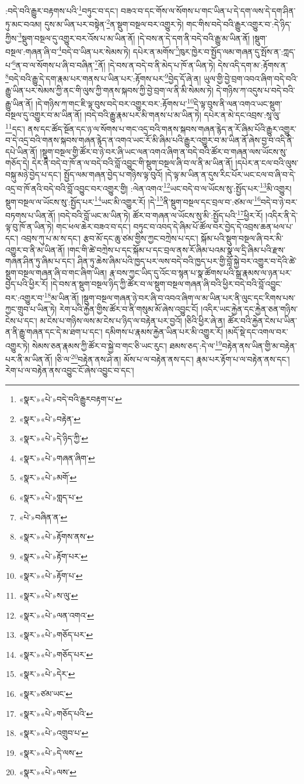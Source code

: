 :བདེ་བའི་རྒྱུར་བརྟགས་པའི་\footnote{«སྣར་»«པེ་»བདེ་བའི་རྒྱུརབརྟག་པ་}བཏུང་བ་དང་། བཟའ་བ་དང་གོས་ལ་སོགས་པ་གང་ཡིན་པ་དེ་དག་ལས་དེ་དག་ཤིན་ཏུ་མང་བའམ། དུས་མ་ཡིན་པར་བསྟེན་\footnote{«སྣར་»«པེ་»བརྟེན་}ན་སྡུག་བསྔལ་བར་འགྱུར་ཏེ། གང་གིས་བདེ་བའི་རྒྱུར་འགྱུར་བ་:དེ་ཉིད་ཀྱིས་\footnote{«སྣར་»«པེ་»དེ་ཉིད་ཀྱི་}སྡུག་བསྔལ་དུ་འགྱུར་བར་འོས་པ་མ་ཡིན་ནོ། །དེ་བས་ན་དེ་དག་ནི་བདེ་བའི་རྒྱུ་མ་ཡིན་ནོ། །སྡུག་བསྔལ་:གཞན་ཞི་བ་\footnote{«སྣར་»«པེ་»གཞན་ཞིག་}བདེ་བ་ཡིན་པར་སེམས་ཏེ། དཔེར་ན་མགོས་\footnote{«སྣར་»«པེ་»མགོ་}ཁུར་ཁྱེར་བ་སྤྱོད་ལམ་གཞན་དུ་སྤོས་ན་:ཀླད་པ་\footnote{«སྣར་»«པེ་»གླད་པ་}ན་བ་ལ་སོགས་པ་ཞི་བ་བཞིན་\footnote{«པེ་»བཞིན་ན་}ནོ། །དེ་བས་ན་བདེ་བ་ནི་མེད་པ་ཁོ་ན་ཡིན་ཏེ། དེས་འདི་དག་མ་:རྟོགས་ན་\footnote{«སྣར་»«པེ་»རྟོགས་ནས་}བདེ་བའི་རྒྱུ་དེ་དག་རྣམ་པར་གནས་པ་ཡིན་པར་:རྟོགས་པར་\footnote{«སྣར་»«པེ་»རྟོག་པར་}བྱེད་དོ་ཞེ་ན། ཡུལ་གྱི་བྱེ་བྲག་འབའ་ཞིག་བདེ་བའི་རྒྱུ་ཡིན་པར་སེམས་ཀྱི་ནང་གི་ལུས་ཀྱི་གནས་སྐབས་ཀྱི་བྱེ་བྲག་ལ་ནི་མི་སེམས་ཏེ། དེ་གཉིས་ཀ་འདུས་པ་བདེ་བའི་རྒྱུ་ཡིན་ནོ། །དེ་གཉིས་ཀ་གང་ཇི་ལྟ་བུས་བདེ་བར་འགྱུར་བར་:རྟོགས་པ་\footnote{«སྣར་»«པེ་»རྟོག་པ་}དེ་ལྟ་བུས་ནི་ལན་འགའ་ཡང་སྡུག་བསྔལ་དུ་འགྱུར་བ་མ་ཡིན་ནོ། །བདེ་བའི་རྒྱུ་རྣམ་པར་མི་གནས་པ་མ་ཡིན་ཏེ། དཔེར་ན་མེ་དང་འབྲས་:སཱ་ལུ་\footnote{«སྣར་»«པེ་»ས་ལུ་}དང་། ནས་དང་ཚོད་སྔོན་དང་ཉ་ལ་སོགས་པ་གང་འདྲ་བའི་གནས་སྐབས་གཞན་རྙེད་ན་རོ་ཞིམ་པོའི་རྒྱུར་འགྱུར་བ་དེ་འདྲ་བའི་གནས་སྐབས་གཞན་རྙེད་ན་འགའ་ཡང་རོ་མི་ཞིམ་པའི་རྒྱུར་འགྱུར་བ་མ་ཡིན་ནོ་ཞེས་བྱ་བ་འདི་ནི་དཔེ་ཡིན་ནོ། །སྡུག་བསྔལ་གྱི་ཚོར་བ་ཉེ་བར་ཞི་ཡང་ལན་འགའ་ཞིག་ན་བདེ་བའི་ཚོར་བ་གཞན་ལས་ཡོངས་སུ་གཅོད་དེ། དེར་ནི་བདེ་བ་ཁོ་ན་ལ་བདེ་བའི་བློ་འབྱུང་གི་སྡུག་བསྔལ་ཞི་བ་ལ་ནི་མ་ཡིན་ནོ། །དཔེར་ན་ངལ་བའི་ལུས་བསྐུ་མཉེ་བྱེད་པ་དང་། སྤྱོད་ལམ་གཞན་བྱེད་པ་གཉིས་ལྟ་བུའོ། །དེ་ལྟ་མ་ཡིན་ན་དུས་རིང་པོར་ཡང་ངལ་བ་ཞི་བ་དེ་འདྲ་བ་ཁོ་ནའི་བདེ་བའི་བློ་འབྱུང་བར་འགྱུར་གྱི། :ལེན་འགའ་\footnote{«སྣར་»«པེ་»ལན་འགའ་}ཡང་བདེ་བ་ལ་ཡོངས་སུ་:སྤྱོད་པར་\footnote{«སྣར་»«པེ་»གཅོད་པར་}མི་འགྱུར། སྡུག་བསྔལ་ལ་ཡོངས་སུ་:སྤྱོད་པར་\footnote{«སྣར་»«པེ་»གཅོད་པར་}ཡང་མི་འགྱུར་རོ། །དེ་\footnote{«སྣར་»«པེ་»དེར་}ནི་སྡུག་བསྔལ་དང་བྲལ་བ་:ཙམ་ལ་\footnote{«སྣར་»ཙམ་ཡང་}བདེ་བ་ཉེ་བར་བཏགས་པ་ཡིན་ནོ། །བདེ་བའི་བློ་ཡང་མ་ཡིན་ཏེ། ཚོར་བ་གཞན་ལ་ཡོངས་སུ་མི་:སྤྱོད་པའི་\footnote{«སྣར་»«པེ་»གཅོད་པའི་}ཕྱིར་རོ། །འདིར་ནི་དེ་ལྟ་བུ་ཁོ་ན་ཡིན་ཏེ། གང་ཕལ་ཆེར་བཟའ་བ་དང་། བཏུང་བ་འབད་དེ་ཞིམ་པོ་ཚོལ་བར་བྱེད་དེ་འབྲས་ཆན་ཕལ་པ་དང་། འབྲས་ཀུ་པ་མ་ས་དང་། རྩབ་མོ་དང་ཆུ་ཙམ་གྱིས་ཀྱང་བཀྲེས་པ་དང་། སྐོམ་པའི་སྡུག་བསྔལ་ཞི་བར་མི་འགྱུར་བ་ནི་མ་ཡིན་ནོ། །གང་གི་ཚེ་བཀྲེས་པ་དང་སྐོམ་པ་དང་བྲལ་ནས་རོ་ཞིམ་པའམ་སྣ་ལ་དྲི་ཞིམ་པའི་རྫས་གཞན་ཤིན་ཏུ་ཞིམ་པ་དང་། ཤིན་ཏུ་ཆེས་ཞིམ་པའི་ཁྱད་པར་ལས་བདེ་བའི་ཁྱད་པར་གྱི་བློ་སྐྱེ་བར་འགྱུར་བ་དེའི་ཚེ་སྡུག་བསྔལ་གཞན་ཞི་བ་གང་ཞིག་ཡིན། རྣ་བས་ཀྱང་ཡིད་དུ་འོང་བ་སྙན་པ་སྣ་ཚོགས་པའི་སྒྲ་རྣམས་ལ་ཉན་པར་བྱེད་པའི་ཕྱིར་རོ། །དེ་བས་ན་སྡུག་བསྔལ་ཉིད་ཀྱི་ཚོར་བ་ལ་སྡུག་བསྔལ་གཞན་ཞི་བའི་ཕྱིར་བདེ་བའི་བློ་འབྱུང་བར་:འགྱུར་བ་\footnote{«སྣར་»«པེ་»འགྲུབ་པ་}མ་ཡིན་ནོ། །སྡུག་བསྔལ་གཞན་ཉེ་བར་ཞི་བ་འབའ་ཞིག་ལ་མ་ཡིན་པར་ནི་ལུང་དང་རིགས་པས་ཀྱང་གྲུབ་པ་ཡིན་ཏེ། རེག་པའི་རྐྱེན་གྱིས་ཚོར་བ་ནི་གསུམ་མོ་ཞེས་འབྱུང་ངོ། །འདིར་ཡང་རྐྱེན་དང་རྐྱེན་ཅན་གཉིས་ངེས་པ་དང་། མ་ངེས་པ་གཉིས་ལས་མ་ངེས་པ་ཉིད་ལ་བརྟེན་པར་བྱའོ། །ཅིའི་ཕྱིར་ཞེ་ན། ཚོར་བའི་རྐྱེན་ངེས་པ་ཡིན་ན་ནི་རྒྱུ་གཞན་དང་དེ་མ་ཐག་པ་དང་། དམིགས་པ་རྣམས་རྐྱེན་ཡིན་པར་མི་འགྱུར་རོ། །མདོ་སྡེ་དང་འགལ་བར་འགྱུར་ཏེ། སེམས་ཅན་རྣམས་ཀྱི་ཚོར་བ་སྐྱེ་བ་གང་ཅི་ཡང་རུང་། ཐམས་ཅད་:དེ་ལ་\footnote{«སྣར་»«པེ་»དེ་ལས་}བརྟེན་ནས་ཡིན་གྱི་མ་བརྟེན་པར་ནི་མ་ཡིན་ནོ། །ཅི་ལ་\footnote{«སྣར་»«པེ་»ལས་}བརྟེན་ནས་ཤེ་ན། མོས་པ་ལ་བརྟེན་ནས་དང་། རྣམ་པར་རྟོག་པ་ལ་བརྟེན་ནས་དང་། རེག་པ་ལ་བརྟེན་ནས་འབྱུང་ངོ་ཞེས་འབྱུང་བ་དང་། 